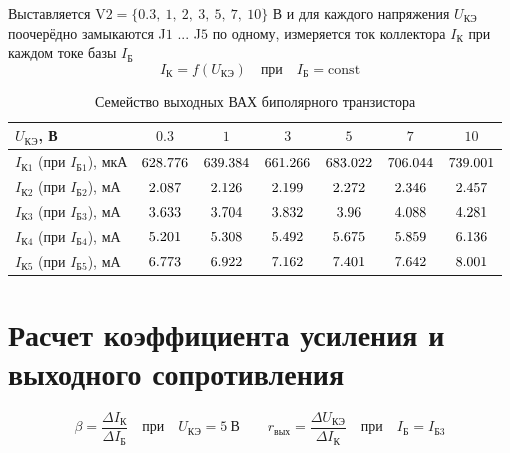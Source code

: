 \documentclass[12pt,a4paper]{article}
\def\IkOneUoThree{\fpeval{628.776 * 10^{-6}}} %
\def\IkOneUone   {\fpeval{639.384 * 10^{-6}}} %
\def\IkOneUthree {\fpeval{661.266 * 10^{-6}}} %
\def\IkOneUfive  {\fpeval{683.022 * 10^{-6}}} %
\def\IkOneUseven {\fpeval{706.044 * 10^{-6}}} %
\def\IkOneUten   {\fpeval{739.001 * 10^{-6}}} %
\def\IkTwoUoThree{\fpeval{2.087 * 10^{-3}}} %
\def\IkTwoUone   {\fpeval{2.126 * 10^{-3}}} %
\def\IkTwoUthree {\fpeval{2.199 * 10^{-3}}} %
\def\IkTwoUfive  {\fpeval{2.272 * 10^{-3}}} %
\def\IkTwoUseven {\fpeval{2.346 * 10^{-3}}} %
\def\IkTwoUten   {\fpeval{2.457 * 10^{-3}}} %
\def\IkThreeUoThree{\fpeval{3.633 * 10^{-3}}} %
\def\IkThreeUone   {\fpeval{3.704 * 10^{-3}}} %
\def\IkThreeUthree {\fpeval{3.832 * 10^{-3}}} %
\def\IkThreeUfive  {\fpeval{3.960 * 10^{-3}}} %
\def\IkThreeUseven {\fpeval{4.088 * 10^{-3}}} %
\def\IkThreeUten   {\fpeval{4.281 * 10^{-3}}} %
\def\IkFourUoThree{\fpeval{5.201 * 10^{-3}}} %
\def\IkFourUone   {\fpeval{5.308 * 10^{-3}}} %
\def\IkFourUthree {\fpeval{5.492 * 10^{-3}}} %
\def\IkFourUfive  {\fpeval{5.675 * 10^{-3}}} %
\def\IkFourUseven {\fpeval{5.859 * 10^{-3}}} %
\def\IkFourUten   {\fpeval{6.136 * 10^{-3}}} %
\def\IkFiveUoThree{\fpeval{6.773 * 10^{-3}}} %
\def\IkFiveUone   {\fpeval{6.922 * 10^{-3}}} %
\def\IkFiveUthree {\fpeval{7.162 * 10^{-3}}} %
\def\IkFiveUfive  {\fpeval{7.401 * 10^{-3}}} %
\def\IkFiveUseven {\fpeval{7.642 * 10^{-3}}} %
\def\IkFiveUten   {\fpeval{8.001 * 10^{-3}}} %
\begin{document}
Выставляется V$2 = \{0.3,\ 1,\ 2,\ 3,\ 5,\ 7,\ 10\}$ В и для каждого напряжения $U_\text{КЭ}$ поочерёдно 
замыкаются J$1$ ... J$5$ по одному, измеряется ток коллектора $I_\text{К}$ при каждом токе базы $I_\text{Б}$
\begin{equation*}
I_\text{К} = f(U_\text{КЭ}) \quad \text{при} \quad I_\text{Б} = \text{const}
\end{equation*}

\begin{table}[H]
\centering
\small
\begin{tabularx}{\textwidth}{|p{3cm}|C|C|C|C|C|C|}
	\hline
	$U_\text{КЭ}$, В & $0.3$ & $1$ & $3$ & $5$ & $7$ & $10$ \\
	\hline
	$I_\text{К1}$ (при $I_\text{Б1}$), мкА & $\fpeval{\IkOneUoThree * 10^{6}}$ & $\fpeval{\IkOneUone * 10^{6}}$ & $\fpeval{\IkOneUthree * 10^{6}}$ & $\fpeval{\IkOneUfive * 10^{6}}$ & $\fpeval{\IkOneUseven * 10^{6}}$ & $\fpeval{\IkOneUten * 10^{6}}$ \\
	\hline
	$I_\text{К2}$ (при $I_\text{Б2}$), мА & $\fpeval{\IkTwoUoThree * 10^{3}}$ & $\fpeval{\IkTwoUone * 10^{3}}$ & $\fpeval{\IkTwoUthree * 10^{3}}$ & $\fpeval{\IkTwoUfive * 10^{3}}$ & $\fpeval{\IkTwoUseven * 10^{3}}$ & $\fpeval{\IkTwoUten * 10^{3}}$ \\
	\hline
	$I_\text{К3}$ (при $I_\text{Б3}$), мА & $\fpeval{\IkThreeUoThree * 10^{3}}$ & $\fpeval{\IkThreeUone * 10^{3}}$ & $\fpeval{\IkThreeUthree * 10^{3}}$ & $\fpeval{\IkThreeUfive * 10^{3}}$ & $\fpeval{\IkThreeUseven * 10^{3}}$ & $\fpeval{\IkThreeUten * 10^{3}}$ \\
	\hline
	$I_\text{К4}$ (при $I_\text{Б4}$), мА & $\fpeval{\IkFourUoThree * 10^{3}}$ & $\fpeval{\IkFourUone * 10^{3}}$ & $\fpeval{\IkFourUthree * 10^{3}}$ & $\fpeval{\IkFourUfive * 10^{3}}$ & $\fpeval{\IkFourUseven * 10^{3}}$ & $\fpeval{\IkFourUten * 10^{3}}$ \\
	\hline
	$I_\text{К5}$ (при $I_\text{Б5}$), мА & $\fpeval{\IkFiveUoThree * 10^{3}}$ & $\fpeval{\IkFiveUone * 10^{3}}$ & $\fpeval{\IkFiveUthree * 10^{3}}$ & $\fpeval{\IkFiveUfive * 10^{3}}$ & $\fpeval{\IkFiveUseven * 10^{3}}$ & $\fpeval{\IkFiveUten * 10^{3}}$ \\
	\hline
\end{tabularx}
\caption{Семейство выходных ВАХ биполярного транзистора}
\end{table}

\section{Расчет коэффициента усиления и выходного сопротивления}
\begin{equation*}
\beta = \frac{\Delta I_\text{К}}{\Delta I_\text{Б}} \quad \text{при} \quad U_\text{КЭ}=5~\text{В} 
\qquad 
r_\text{вых} = \frac{\Delta U_\text{КЭ}}{\Delta I_\text{К}} \quad \text{при} \quad I_\text{Б}=I_\text{Б3}
\end{equation*}
\end{document}

